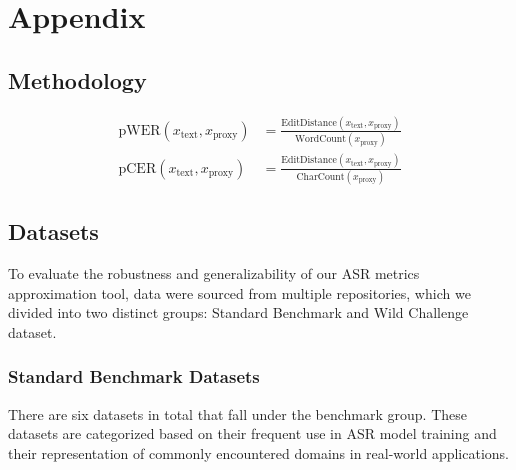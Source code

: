 \clearpage
\section{Appendix}\label{appsec:appendix}
\subsection{Methodology}\label{appsubsec:methodology}




\begin{align}
    \text{pWER}(x_{\text{text}}, x_{\text{proxy}}) &= \frac{\text{EditDistance}(x_{\text{text}}, x_{\text{proxy}})}{\text{WordCount}(x_{\text{proxy}})} \\
    \text{pCER}(x_{\text{text}}, x_{\text{proxy}}) &= \frac{\text{EditDistance}(x_{\text{text}}, x_{\text{proxy}})}{\text{CharCount}(x_{\text{proxy}})}
\end{align}

\subsection{Datasets}\label{appsubsec:datasets}

To evaluate the robustness and generalizability of our ASR metrics approximation tool, data were sourced from multiple repositories, which we divided into two distinct groups: Standard Benchmark and Wild Challenge dataset. 
\subsubsection{Standard Benchmark Datasets} 

There are six datasets in total that fall under the benchmark group. These datasets are categorized based on their frequent use in ASR model training and their representation of commonly encountered domains in real-world applications. 


